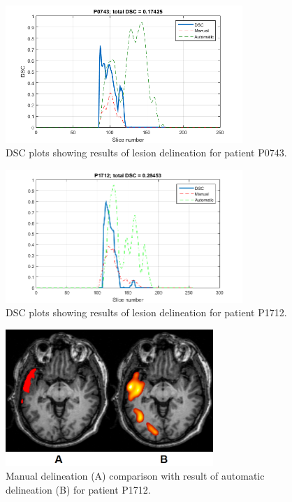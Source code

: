 \documentclass[12pt]{article}
\begin{document}
\begin{figure}[!htb]
\centering
\includegraphics[width=0.8\textwidth]{img/P0743_L}
\caption{DSC plots showing results of lesion delineation for patient P0743.}
\label{fig:defaultDSC0743}
\end{figure}

\begin{figure}[!htb]
\centering
\includegraphics[width=0.8\textwidth]{img/P1712_L}
\caption{DSC plots showing results of lesion delineation for patient P1712.}
\label{fig:defaultDSC1712}
\end{figure}

\begin{figure}[!htb]
\centering
\includegraphics[width=0.7\textwidth]{img/javaw_2017-01-27_13-55-31}
\caption{Manual delineation (A) comparison with result of automatic delineation (B) for patient P1712.}
\label{fig:tooMuchDelineated}
\end{figure}
\end{document}
